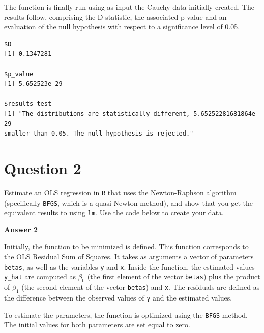 \documentclass[12pt,letterpaper]{article}
\begin{document}
\vspace{0.5cm}
\noindent The function is finally run using as input the Cauchy data initially created. The results follow, comprising the D-statistic, the associated p-value and an evaluation of the null hypothesis with respect to a significance level of 0.05.

\vspace{0.5cm}


\vspace{0.5cm}
\begin{verbatim}
$D
[1] 0.1347281

$p_value
[1] 5.652523e-29

$results_test
[1] "The distributions are statistically different, 5.65252281681864e-29 
smaller than 0.05. The null hypothesis is rejected."
\end{verbatim}

\section*{Question 2}
\noindent Estimate an OLS regression in \texttt{R} that uses the Newton-Raphson algorithm (specifically \texttt{BFGS}, which is a quasi-Newton method), and show that you get the equivalent results to using \texttt{lm}. Use the code below to create your data.
\vspace{.5cm}
 


\vspace{2cm}

\noindent\textbf{Answer 2}\\
\vspace{0.5cm}

\noindent Initially, the function to be minimized is defined. This function corresponds to the OLS Residual Sum of Squares. It takes as arguments a vector of parameters \texttt{betas}, as well as the variables \texttt{y} and \texttt{x}. Inside the function, the estimated values \texttt{y\_hat} are computed as $\beta_0$ (the first element of the vector \texttt{betas}) plus the product of $\beta_1$ (the second element of the vector \texttt{betas}) and \texttt{x}. The residuals are defined as the difference between the observed values of \texttt{y} and the estimated values.

\noindent To estimate the parameters, the function is optimized using the \texttt{BFGS} method. The initial values for both parameters are set equal to zero.
\end{document}
